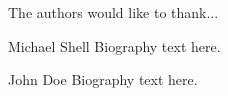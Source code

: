 \documentclass[journal]{IEEEtran}
\begin{document}
The authors would like to thank...


\ifCLASSOPTIONcaptionsoff
  \newpage
\fi







%

%

% 

\begin{IEEEbiography}{Michael Shell}
Biography text here.
\end{IEEEbiography}

\begin{IEEEbiographynophoto}{John Doe}
Biography text here.
\end{IEEEbiographynophoto}
\end{document}
